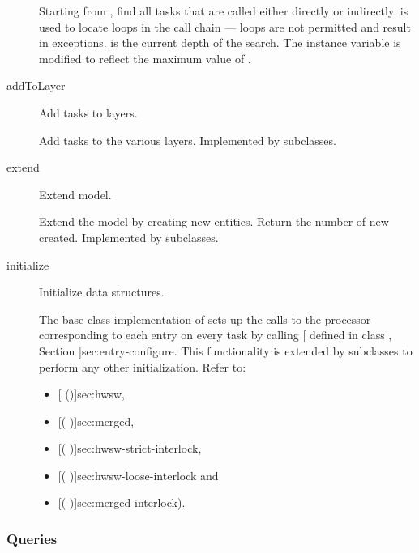 \begin{description}
Starting from , find all tasks that are called either
directly or indirectly.   is used to locate loops in the
call chain --- loops are not permitted and result in exceptions.
 is the current depth of the search.  The instance variable
 is modified to reflect the
maximum value of .  

\label{sec:layerize-addToLayer}
\item[addToLayer] \texonly{---} Add tasks to layers.\\

Add tasks to the various layers.  Implemented by subclasses.

\label{sec:layerize-extend}
\item[extend] \texonly{---} Extend model.\\

Extend the model by creating new entities.  Return the number of new
 created.  Implemented by subclasses.

\label{sec:layerize-initialize}
\item[initialize] \texonly{---} Initialize data structures.\\

The base-class implementation of  sets up the calls
to the processor corresponding to each entry on every task by calling
[ defined in class , Section
\Ref]{sec:entry-configure}.  This functionality is extended by
subclasses to perform any other initialization.  Refer to:
\begin{itemize}
\item {}[ (\Sec\Ref)]{sec:hwsw},
\item {}[( \Sec\Ref)]{sec:merged},
\item {}[( \Sec\Ref)]{sec:hwsw-strict-interlock},
\item {}[( \Sec\Ref)]{sec:hwsw-loose-interlock} and
\item {}[( \Sec\Ref)]{sec:merged-interlock}).
\end{itemize}

\end{description}

\subsubsection{Queries}

